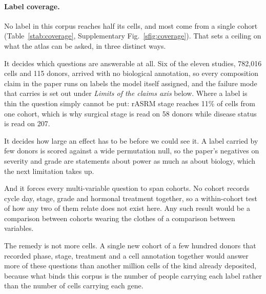 \paragraph{Label coverage.} No label in this corpus reaches half its
cells, and most come from a single cohort
(Table~\ref{stab:coverage}, Supplementary Fig.~\ref{sfig:coverage}). That
sets a ceiling on what the atlas can be asked, in three distinct ways.

It decides which questions are answerable at all. Six of the eleven
studies, 782{,}016 cells and 115 donors, arrived with no biological
annotation, so every composition claim in the paper runs on labels the
model itself assigned, and the failure mode that carries is set out under
\emph{Limits of the claims axis} below. Where a label is thin the
question simply cannot be put: rASRM stage reaches 11\% of cells from one
cohort, which is why surgical stage is read on 58 donors while disease
status is read on 207.

It decides how large an effect has to be before we could see it. A label
carried by few donors is scored against a wide permutation null, so the
paper's negatives on severity and grade are statements about power as much
as about biology, which the next limitation takes up.

And it forces every multi-variable question to span cohorts. No cohort
records cycle day, stage, grade and hormonal treatment together, so a
within-cohort test of how any two of them relate does not exist here. Any
such result would be a comparison between cohorts wearing the clothes of a
comparison between variables.

The remedy is not more cells. A single new cohort of a few hundred donors
that recorded phase, stage, treatment and a cell annotation together would
answer more of these questions than another million cells of the kind
already deposited, because what binds this corpus is the number of people
carrying each label rather than the number of cells carrying each gene.

\begin{table}[p]
\centering
\caption[Label coverage by study]{\textbf{Cells carrying each label, by
study.} Donor identifiers rather than people, so the two
\texttt{garcia\_alonso} rows share fifteen donors. Six studies carry none
of the eight labels.}
\label{stab:coverage}
\footnotesize\setlength{\tabcolsep}{3pt}
\resizebox{\textwidth}{!}{}
\end{table}


